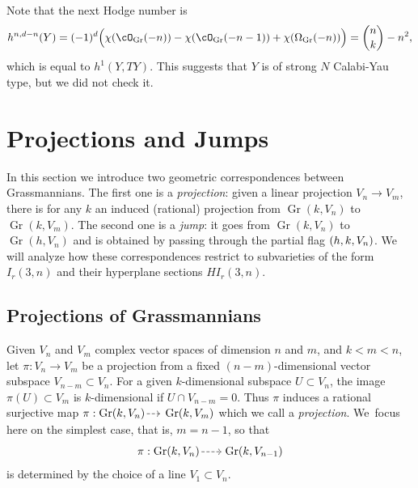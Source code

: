 \documentclass[JEP,XML,SOM,Unicode,NoEqCountersInSection]{cedram}
\newcommand{\NoChangel}[1]{%
\expandafter\let\csname old\string#1\endcsname=#1
\let#1=\relax
\newcommand{#1}{\mathcode`l="716C\csname old\string#1\endcsname\mathcode`l="7160 }%
}
\newcommand{\dradpl}{{\hspace*{-2.5mm}\begin{tikzcd}[ampersand replacement=\&,column sep = scriptsize]\mbox{}\ar[r,dashed]\&\mbox{}\end{tikzcd}\hspace*{-2.5mm}}}
\newcommand{\dratst}{{\hspace*{-2.5mm}\begin{tikzcd}[ampersand replacement=\&,column sep = small]\mbox{}\ar[r,dashed]\&\mbox{}\end{tikzcd}\hspace*{-2mm}}}
\let\drascst\dratst
\newcommand{\dra}{\mathchoice{\dradpl}{\dratst}{\drascst}{\drascst}}
\let\dashrightarrow\dra
\theoremstyle{plain}
\theoremstyle{definition}
\newcommand{\linedef}[1]{\emph{#1}}
\DeclareMathOperator{\Gr}{Gr}
\DeclareMathOperator{\Fl}{Fl}\NoChangel{\Fl}
\begin{document}
Note that the next Hodge number is
\[
h^{n,d-n}(Y)= (-1)^d\Big(\chi(\cO_{\Gr}(-n))-\chi(\cO_{\Gr}(-n-1))+\chi(\Omega_{\Gr}(-n))\Big)=\binom{n}{k}-n^2,
\]
which is equal to $h^1(Y,TY)$. This suggests that $Y$ is of strong $N$ Calabi-Yau type,
but we did not check it.

\section{Projections and Jumps}\label{sect:proj-jump}
In this section we introduce two geometric correspondences between Grassmannians. The first one
is a \linedef{projection}: given a linear projection $V_n\to V_m$, there is for any $k$ an induced (rational) projection from $\Gr(k,V_n)$ to $\Gr(k,V_m)$. The second one is a \linedef{jump}: it goes from $\Gr(k,V_n)$ to $\Gr(h,V_n)$ and is obtained by passing through the partial flag $\Fl(h,k,V_n)$. We will analyze how these correspondences restrict to subvarieties of the form $I_r(3,n)$ and their hyperplane sections $HI_r(3,n)$.

\subsection{Projections of Grassmannians}
Given $V_n$ and $V_m$ complex vector spaces of dimension $n$ and $m$, and $k< m < n$, let
$\pi: V_n \to V_m$ be a projection from a fixed \hbox{$(n-m)$}\nobreakdash-dimensional vector subspace $V_{n-m} \subset V_n$. For a given $k$-dimensional subspace $U \subset V_n$, the image $\pi(U) \subset V_m$ is $k$-dimensional if $U \cap V_{n-m} = 0$. Thus $\pi$ induces a ratio\-nal surjective map $\pi: \Gr(k,V_n) \dashrightarrow \Gr(k,V_m)$ which we call a \linedef{projection}. We~\hbox{focus} here on the simplest case, that is, $m=n-1$, so that
\[
\pi: \Gr(k,V_n) \dashrightarrow \Gr(k,V_{n-1})
\]
is determined by the choice of a line $V_1 \subset V_n$.
\end{document}
